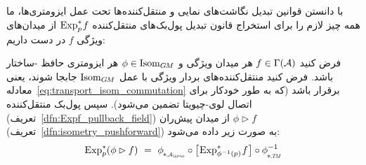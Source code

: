 با دانستن قوانین تبدیل نگاشت‌های نمایی و منتقل‌کننده‌ها تحت عمل ایزومتری‌ها، ما همه چیز لازم را برای استخراج قانون تبدیل پول‌بک‌های منتقل‌کننده $\operatorname{Exp}^*_p\mkern-2mu f$ از میدان‌های ویژگی $f$ در دست داریم:
\begin{thm}
\label{thm:transporter_pullback_isometry_action}
    فرض کنید $f\in \Gamma(\mathcal{A})$ هر میدان ویژگی و $\phi \in \operatorname{Isom}_{G\mkern-1.4muM}$ هر ایزومتری حافظ -ساختار باشد.
    فرض کنید منتقل‌کننده‌های بردار ویژگی با عمل $\operatorname{Isom}_{G\mkern-1.4muM}$ جابجا شوند، یعنی معادله~\eqref{eq:transport_isom_commutation} برقرار باشد
    (که به طور خودکار برای اتصال لوی-چیویتا تضمین می‌شود).
    سپس پول‌بک منتقل‌کننده (تعریف~\ref{dfn:Expf_pullback_field}) از میدان پیش‌ران $\phi\rhd \!f$ (تعریف~\ref{dfn:isometry_pushforward}) به صورت زیر داده می‌شود:
    \begin{align}\label{eq:transporter_pullback_isometry_commutativity}
        \Expsp (\phi \rhd f)
        \ =\ 
        \dphiAout \!\circ \big[\mkern-2mu \Expsphiinvpf \mkern1mu\big] \circ \dphiTM^{-1}
    \end{align}
\end{thm}
